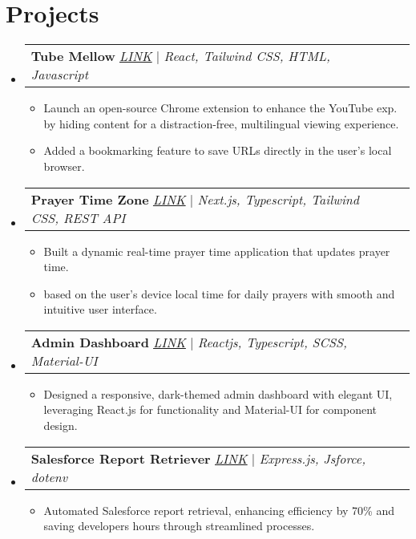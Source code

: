 \documentclass[letterpaper,11pt]{article}
\makeatletter
\newcommand{\resumeItem}[1]{
  \item\small{
    {#1 \vspace{-2pt}}
  }
}
\newcommand{\resumeProjectHeading}[2]{
    \item
    \begin{tabular*}{0.97\textwidth}{l@{\extracolsep{\fill}}r}
      \small#1 & #2 \\
    \end{tabular*}\vspace{-7pt}
}
\newcommand{\resumeSubHeadingListStart}{\begin{itemize}[leftmargin=0.15in, label={}]}
\newcommand{\resumeSubHeadingListEnd}{\end{itemize}}
\newcommand{\resumeItemListStart}{\begin{itemize}}
\newcommand{\resumeItemListEnd}{\end{itemize}\vspace{-5pt}}
\makeatother
\begin{document}
\section{Projects}
    \resumeSubHeadingListStart
      \resumeProjectHeading
          {\textbf{Tube Mellow} \href{https://chromewebstore.google.com/detail/tube-mellow/fgflinjcolmfjdkilakkcgennlkhgkgh}{\underline{\emph{LINK}}} | \emph{React, Tailwind CSS, HTML, Javascript}}{}
          \resumeItemListStart
            \resumeItem{Launch an open-source Chrome extension to enhance the YouTube exp. by hiding content for a distraction-free,
multilingual viewing experience.}
\resumeItem{Added a bookmarking feature to save URLs directly in the user’s local browser.}
          \resumeItemListEnd
      \resumeProjectHeading
          {\textbf{Prayer Time Zone} \href{https://prayer-time-zone.vercel.app/}{\underline{\emph{LINK}}} | \emph{Next.js, Typescript, Tailwind CSS, REST API}}{}
          \resumeItemListStart
            \resumeItem{Built a dynamic real-time prayer time application that updates prayer time.}
            \resumeItem{based on the user’s device local time for daily prayers with smooth and intuitive user interface.}
          \resumeItemListEnd
      \resumeProjectHeading
          {\textbf{Admin Dashboard} \href{https://admin-dashboard-hakeem.vercel.app/}{\underline{\emph{LINK}}} | \emph{Reactjs, Typescript, SCSS, Material-UI}}{}
          \resumeItemListStart
            \resumeItem{Designed a responsive, dark-themed admin dashboard with elegant UI, leveraging React.js for functionality and Material-UI for component design.}
          \resumeItemListEnd
      \resumeProjectHeading
          {\textbf{Salesforce Report Retriever} \href{https://github.com/hakeemsalman/Salesforce-Report-Retriever/}{\underline{\emph{LINK}}} | \emph{Express.js, Jsforce, dotenv}}{}
          \resumeItemListStart
            \resumeItem{Automated Salesforce report retrieval, enhancing efficiency by 70\% and saving developers hours through streamlined processes.}
          \resumeItemListEnd
    \resumeSubHeadingListEnd


%
\end{document}

